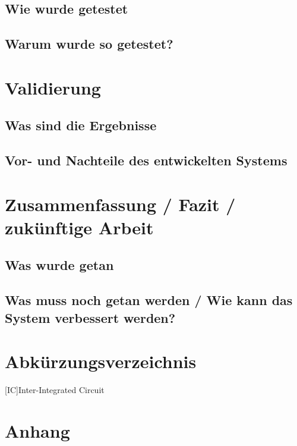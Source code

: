 \documentclass[a4paper,12pt]{article}
\newcounter{savepage}
\begin{document}
\subsection{Wie wurde getestet}
\blindtext
\subsection{Warum wurde so getestet?}
\blindtext
\section{Validierung}
\blindtext
\subsection{Was sind die Ergebnisse}
\blindtext
\subsection{Vor- und Nachteile des entwickelten Systems}
\blindtext
\section{Zusammenfassung / Fazit / zukünftige Arbeit}
\blindtext
\subsection{Was wurde getan}
\blindtext
\subsection{Was muss noch getan werden / Wie kann das System verbessert werden?}
\blindtext
\newpage
\cleardoublepage
{}
\setcounter{page}{\thesavepage}
\clearpage
{}
{}
\printbibliography
\newpage
\renewcommand{\indexname}{Stichwortverzeichnis}
\printindex
{}
\newpage
\section*{Abkürzungsverzeichnis}
\begin{acronym}[Bash] %
	[IC]{Inter-Integrated Circuit}
\end{acronym}
\newpage
{}
{}
\listoffigures
\newpage
{}
{}
\listoftables
\newpage
\section*{Anhang}
\end{document}
